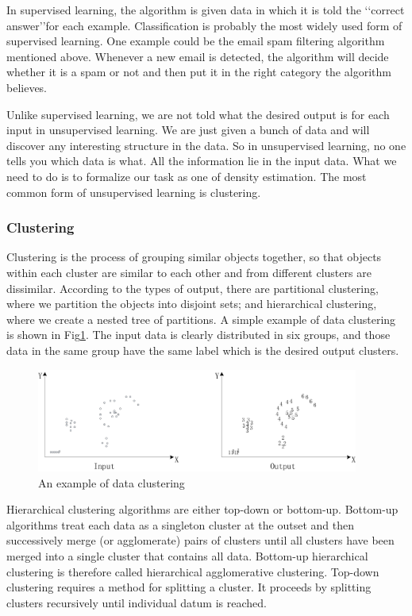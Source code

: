In supervised learning, the algorithm is given data in which it is told the \lq\lq{correct answer}\rq\rq for each example\cite{stanford}. Classification is probably the most widely used form of supervised learning. One example could be the email spam filtering algorithm mentioned above. Whenever a new email is detected, the algorithm will decide whether it is a spam or not and then put it in the right category the algorithm believes.  

Unlike supervised learning, we are not told what the desired output is for each input in unsupervised learning. We are just given a bunch of data and will discover any interesting structure in the data. So in unsupervised learning, no one tells you which data is what. All the information lie in the input data. What we need to do is to formalize our task as one of density estimation\cite{murphy2012machine}. The most common form of unsupervised learning is clustering.

\subsubsection {Clustering}
Clustering is the process of grouping similar objects together, so that objects within each cluster are similar to each other and from different clusters are dissimilar. According to the types of output, there are partitional clustering, where we partition the objects into disjoint sets; and hierarchical clustering, where we create a nested tree of partitions\cite{murphy2012machine}. A simple example of data clustering is shown in Fig\ref{Fig:clustering}. The input data is clearly distributed in six groups, and those data in the same group have the same label which is the desired output clusters.

\begin{figure}[h!]
    \centering
    \includegraphics[width=300pt]{../images/clustering.jpg}
    \caption{An example of data clustering}
    \label{Fig:clustering}
\end{figure}
	
Hierarchical clustering algorithms are either top-down or bottom-up. Bottom-up algorithms treat each data as a singleton cluster at the outset and then successively merge (or agglomerate) pairs of clusters until all clusters have been merged into a single cluster that contains all data. Bottom-up hierarchical clustering is therefore called hierarchical agglomerative clustering. Top-down clustering requires a method for splitting a cluster. It proceeds by splitting clusters recursively until individual datum is reached\cite{manning2008introduction}.
